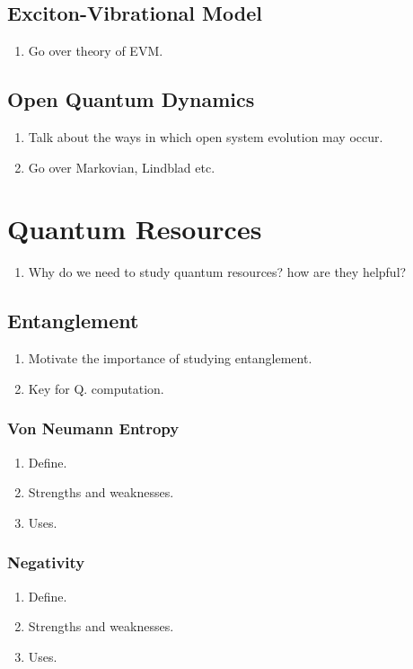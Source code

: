 \documentclass{article}
\begin{document}
\subsection{Exciton-Vibrational Model}
\begin{enumerate}
    \item Go over theory of EVM.
\end{enumerate}
\subsection{Open Quantum Dynamics}
\begin{enumerate}
    \item Talk about the ways in which open system evolution may occur.
    \item Go over Markovian, Lindblad etc.
\end{enumerate}
\newpage
\section{Quantum Resources}
\begin{enumerate}
    \item Why do we need to study quantum resources? how are they helpful?
\end{enumerate}
\subsection{Entanglement}
\begin{enumerate}
    \item Motivate the importance of studying entanglement. 
    \item Key for Q. computation.
\end{enumerate}
\subsubsection{Von Neumann Entropy}
\begin{enumerate}
    \item Define.
    \item Strengths and weaknesses.
    \item Uses.
\end{enumerate}
\subsubsection{Negativity}
\begin{enumerate}
    \item Define.
    \item Strengths and weaknesses.
    \item Uses.
\end{enumerate}
\end{document}
